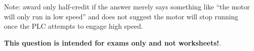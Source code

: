 \vskip 10pt

Note: award only half-credit if the answer merely says something like ``the motor will only run in low speed'' and does not suggest the motor will stop running once the PLC attempts to engage high speed.







{\bf This question is intended for exams only and not worksheets!}.


